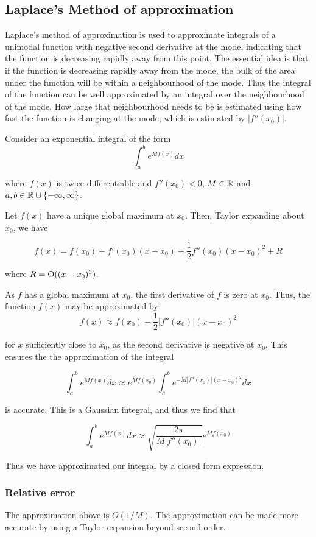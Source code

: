 \documentclass{amsart}[12pt]
\begin{document}
\subsection{Laplace's Method of approximation}

Laplace's method of approximation is used to approximate integrals of a unimodal function with negative second
derivative at the mode, indicating that the function is decreasing rapidly away from this point. The essential
idea is that if the function is decreasing rapidly away from the mode, the bulk of the area under the function
will be within a neighbourhood of the mode. Thus the integral of the function can be well approximated by an
integral over the neighbourhood of the mode. How large that neighbourhood needs to be is estimated using
how fast the function is changing at the mode, which is estimated by $|f''(x_0)|$.

Consider an exponential integral of the form
\[
	\int_a^b e^{M f(x)} dx
\]

where $f(x)$ is twice differentiable and $f''(x_0) < 0$, $M \in {\mathbb{R}}$ and $a, b \in {\mathbb{R}} \cup \{-\infty, \infty\}$.

Let $f(x)$ have a unique global maximum at $x_0$. Then, Taylor expanding about $x_0$, we have

\[
	f(x) = f(x_0) + f'(x_0) (x - x_0) + \frac{1}{2} f''(x_0) (x - x_0)^2 + R
\]

where $R = \text{O}((x - x_0)^3)$.

As $f$ has a global maximum at $x_0$, the first derivative of $f$ is zero at $x_0$. Thus, the function $f(x)$
may be approximated by
\[
	f(x) \approx f(x_0) - \frac{1}{2} |f''(x_0)| (x - x_0)^2
\]

for $x$ sufficiently close to $x_0$, as the second derivative is negative at $x_0$. This ensures the
the approximation of the integral

\[
	\int_a^b e^{M f(x)} dx \approx e^{M f(x_0)} \int_a^b e^{-M |f''(x_0)|(x - x_0)^2} dx
\]

is accurate. This is a Gaussian integral, and thus we find that

\[
	\int_a^b e^{M f(x)} dx \approx \sqrt{\frac{2 \pi}{M |f''(x_0)|}} e^{M f(x_0)}
\]

Thus we have approximated our integral by a closed form expression.

\subsubsection{Relative error} %
The approximation above is $O(1/M)$. %
The approximation can be made more accurate by using a Taylor
expansion beyond second order.
\end{document}
